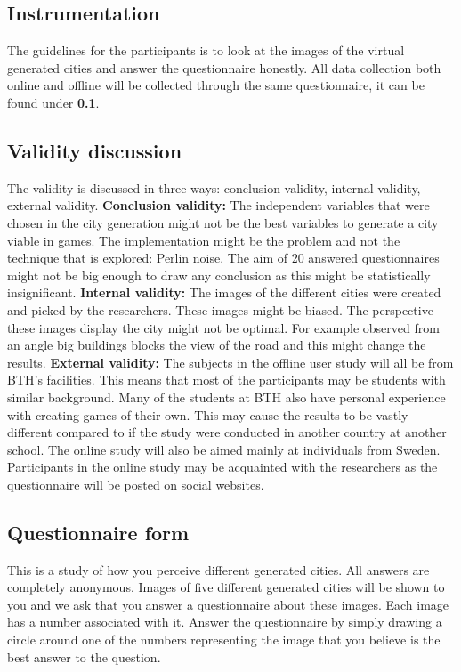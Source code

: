 	\subsection*{Instrumentation}
	The guidelines for the participants is to look at the images of the virtual generated cities and answer the questionnaire honestly. All data collection both online and offline will be collected through the same questionnaire, it can be found under \textbf{\ref{ssssec:questionnaire}}.
			
	\subsection*{Validity discussion} 
	The validity is discussed in three ways: conclusion validity, internal validity, external validity. \cite{ExperimentationInSoftware}
	\textbf{Conclusion validity:} The independent variables that were chosen in the city generation might not be the best variables to generate a city viable in games. The implementation might be the problem and not the technique that is explored: Perlin noise. The aim of 20 answered questionnaires might not be big enough to draw any conclusion as this might be statistically insignificant.
	\textbf{Internal validity:} The images of the different cities were created and picked by the researchers. These images might be biased. The perspective these images display the city might not be optimal. For example observed from an angle big buildings blocks the view of the road and this might change the results.
	\textbf{External validity:} The subjects in the offline user study will all be from BTH’s facilities. This means that most of the participants may be students with similar background. Many of the students at BTH also have personal experience with creating games of their own. This may cause the results to be vastly different compared to if the study were conducted in another country at another school. The online study will also be aimed mainly at individuals from Sweden. Participants in the online study may be acquainted with the researchers as the questionnaire will be posted on social websites.
			
	\subsection{Questionnaire form} \label{ssssec:questionnaire}
	This is a study of how you perceive different generated cities. All answers are completely anonymous. Images of five different generated cities will be shown to you and we ask that you answer a questionnaire about these images. Each image has a number associated with it. Answer the questionnaire by simply drawing a circle around one of the numbers representing the image that you believe is the best answer to the question.
			
